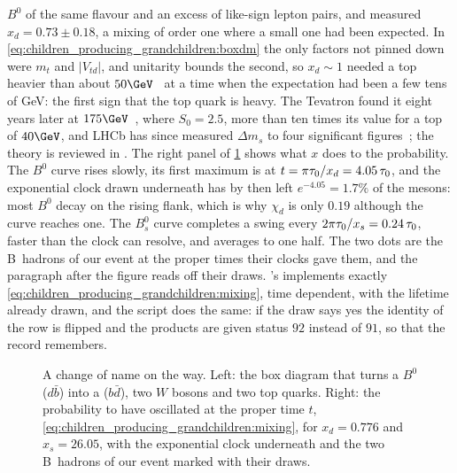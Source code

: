 $B^0$ of the same flavour and an excess of like-sign lepton pairs, and
measured $x_d=0.73\pm0.18$, a mixing of order one where a small one had
been expected. In \cref{eq:children_producing_grandchildren:boxdm} the
only factors not pinned down were $m_t$ and $|V_{td}|$, and unitarity
bounds the second, so $x_d\sim1$ needed a top heavier than about
$50\GeV$~\cite{Ellis:1987bmixing} at a time when the expectation had been
a few tens of GeV: the first sign that the top quark is heavy. The
Tevatron found it eight years later at
$175\GeV$~\cite{CDF:1995wbb,D0:1995jca}, where $S_0=2.5$, more than ten
times its value for a top of $40\GeV$, and LHCb has since measured
$\Delta m_s$ to four significant figures~\cite{LHCb:2021moh}; the theory
is reviewed in \cite{Artuso:2015swg}. The right panel of
\cref{fig:children_producing_grandchildren:mixing_sketch} shows what $x$
does to the probability. The $B^0$ curve rises slowly, its first maximum
is at $t=\pi\tau_0/x_d=4.05\,\tau_0$, and the exponential clock drawn
underneath has by then left $e^{-4.05}=1.7\%$ of the mesons: most $B^0$
decay on the rising flank, which is why $\chi_d$ is only $0.19$ although
the curve reaches one. The $B_s^0$ curve completes a swing every
$2\pi\tau_0/x_s=0.24\,\tau_0$, faster than the clock can resolve, and
averages to one half. The two dots are the B~hadrons of our event at the
proper times their clocks gave them, and the paragraph after the figure
reads off their draws. \PYTHIA's 
implements exactly \cref{eq:children_producing_grandchildren:mixing}, time
dependent, with the lifetime already drawn, and the script does the same:
if the draw says yes the identity of the row is flipped and the products
are given status $92$ instead of $91$, so that the record remembers.

\begin{figure}[htbp]\centering
\resizebox{\textwidth}{!}{}
\caption[The box diagram and the oscillation probability]{A change of name
on the way. Left: the box diagram that turns a $B^0$ ($d\bar b$) into a
\Bbar ($b\bar d$), two $W$ bosons and two top quarks. Right: the
probability to have oscillated at the proper time $t$,
\cref{eq:children_producing_grandchildren:mixing}, for $x_d=0.776$ and
$x_s=26.05$, with the exponential clock underneath and the two B~hadrons
of our event marked with their draws.}
\label{fig:children_producing_grandchildren:mixing_sketch}
\end{figure}

